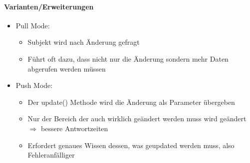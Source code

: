 \documentclass[
    ngerman,
    color=3b,
    summary,
    boxarc,
    main,
]{rubos-tuda-template}
\begin{document}
\paragraph{Varianten/Erweiterungen}\mbox{}\par
\begin{itemize}
    \item Pull Mode:\begin{itemize}
              \item Subjekt wird nach Änderung gefragt
              \item Führt oft dazu, dass nicht nur die Änderung sondern mehr Daten abgerufen werden müssen
          \end{itemize}
    \item Push Mode:\begin{itemize}
              \item Der update() Methode wird die Änderung als Parameter übergeben
              \item Nur der Bereich der auch wirklich geändert werden muss wird geändert $\Rightarrow$ bessere Antwortzeiten
              \item Erfordert genaues Wissen dessen, was geupdated werden muss, also Fehleranfälliger
          \end{itemize}
\end{itemize}

\clearpage
\end{document}
